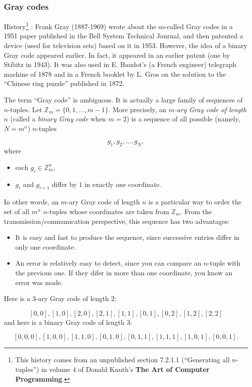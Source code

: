 \subsubsection{Gray codes}

History\footnote{This
history comes from an unpublished section 7.2.1.1
(``Generating all $n$-tuples'')
in volume 4 of Donald Knuth's {\bf The Art of Computer Programming}.
}
: Frank Gray (1887-1969) wrote about the so-called Gray codes in a
1951 paper published in the Bell System Technical Journal,
and then patented a device (used for television sets)
based on it in 1953. However, the idea of a binary Gray code
appeared earlier. In fact, it appeared in an earlier patent
(one by Stibitz in 1943). It was also used in E. Baudot's
(a French engineer) telegraph machine of 1878 and in
a French booklet by L. Gros on the solution to the
``Chinese ring puzzle'' published in 1872.

The term ``Gray code'' is ambiguous. It is actually a
large family of sequences of $n$-tuples. Let
${\mathbb{Z}}_m=\{0,1,\dots,m-1\}$. More precisely, an
{\it $m$-ary Gray code of length $n$} (called a {\it binary
Gray code} when $m=2$) is a sequence of
all possible (namely, $N=m^n$) $n$-tuples

\[
g_1,g_2,\dots, g_N,
\]
where
\begin{itemize}
\item
each $g_i\in {\mathbb{Z}}_m^n$,
\item
$g_i$ and $g_{i+1}$ differ by $1$ in exactly one
coordinate.
\end{itemize}
In other words, an $m$-ary Gray code of length
$n$ is a particular way to order the set of all
$m^n$ $n$-tuples whose coordinates are taken from
${\mathbb{Z}}_m$. From the transmission/communication
perspective, this sequence has two advantages:

\begin{itemize}
\item
It is easy and fast to produce the sequence, since
successive entries differ in only one coordinate.

\item
An error is relatively easy to detect, since you can
compare an $n$-tuple with the previous one. If they
difer in more than one coordinate, you know an error
was made.

\end{itemize}

\begin{example}
{\rm
Here is a $3$-ary Gray code of length $2$:

\[
[0, 0], [1, 0], [2, 0], [2, 1], [1, 1], [0, 1], [0, 2], [1, 2], [2, 2]
\]
and here is a binary Gray code of length $3$:

\[
[0, 0, 0], [1, 0, 0], [1, 1, 0], [0, 1, 0], [0, 1, 1], [1, 1, 1], [1, 0, 1], [0, 0, 1].
\]
}
\end{example}

